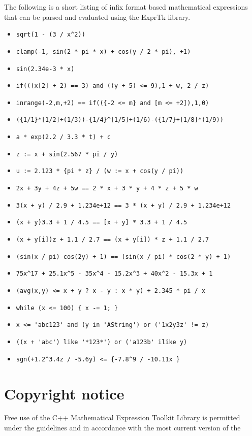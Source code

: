 The following is a short listing of infix format based mathematical
expressions that can be parsed and evaluated using the ExprTk library.
\begin{itemize}
\item \verb'sqrt(1 - (3 / x^2))' 
\item \verb'clamp(-1, sin(2 * pi * x) + cos(y / 2 * pi), +1)' 
\item \verb'sin(2.34e-3 * x)' 
\item \verb'if(((x[2] + 2) == 3) and ((y + 5) <= 9),1 + w, 2 / z)' 
\item \verb'inrange(-2,m,+2) == if(({-2 <= m} and [m <= +2]),1,0)' 
\item \verb'({1/1}*[1/2]+(1/3))-{1/4}^[1/5]+(1/6)-({1/7}+[1/8]*(1/9))' 
\item \verb'a * exp(2.2 / 3.3 * t) + c' 
\item \verb'z := x + sin(2.567 * pi / y)' 
\item \verb'u := 2.123 * {pi * z} / (w := x + cos(y / pi))' 
\item \verb'2x + 3y + 4z + 5w == 2 * x + 3 * y + 4 * z + 5 * w' 
\item \verb'3(x + y) / 2.9 + 1.234e+12 == 3 * (x + y) / 2.9 + 1.234e+12' 
\item \verb'(x + y)3.3 + 1 / 4.5 == [x + y] * 3.3 + 1 / 4.5' 
\item \verb'(x + y[i])z + 1.1 / 2.7 == (x + y[i]) * z + 1.1 / 2.7' 
\item \verb'(sin(x / pi) cos(2y) + 1) == (sin(x / pi) * cos(2 * y) + 1)' 
\item \verb'75x^17 + 25.1x^5 - 35x^4 - 15.2x^3 + 40x^2 - 15.3x + 1' 
\item \verb'(avg(x,y) <= x + y ? x - y : x * y) + 2.345 * pi / x' 
\item \verb'while (x <= 100) { x -= 1; }' 
\item \verb"x <= 'abc123' and (y in 'AString') or ('1x2y3z' != z)" 
\item \verb"((x + 'abc') like '*123*') or ('a123b' ilike y)" 
\item \verb'sgn(+1.2^3.4z / -5.6y) <= {-7.8^9 / -10.11x }' 
\end{itemize}

\section{Copyright notice}

Free use of the C++ Mathematical Expression Toolkit Library is permitted
under the guidelines and in accordance with the most current version
of the 

